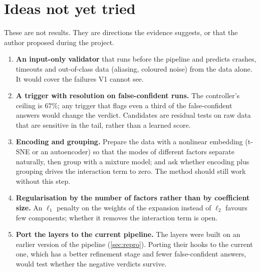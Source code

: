 \section{Ideas not yet tried}\label{sec:ideas}
These are not results. They are directions the evidence suggests, or that the author proposed during the project.
\begin{enumerate}
\item \textbf{An input-only validator} that runs before the pipeline and predicts crashes, timeouts and out-of-class data (aliasing, coloured noise) from the data alone. It would cover the failures V1 cannot see.
\item \textbf{A trigger with resolution on false-confident runs.} The controller's ceiling is $67\%$; any trigger that flags even a third of the false-confident answers would change the verdict. Candidates are
  residual tests on raw data that are sensitive in the tail, rather than a learned score.
\item \textbf{Encoding and grouping.} Prepare the data with a nonlinear embedding (t-SNE or an autoencoder) so that the modes of different factors separate naturally, then group with a mixture model; and ask
  whether encoding plus grouping drives the interaction term to zero. The method should still work without this step.
\item \textbf{Regularisation by the number of factors rather than by coefficient size.} An $\ell_1$ penalty on the weights of the expansion instead of $\ell_2$ favours few components; whether it removes the interaction term is open.
\item \textbf{Port the layers to the current pipeline.} The layers were built on an earlier version of the pipeline (\cref{sec:repro}). Porting their hooks to the current one, which has a better refinement stage and fewer false-confident
  answers, would test whether the negative verdicts survive.
\end{enumerate}

